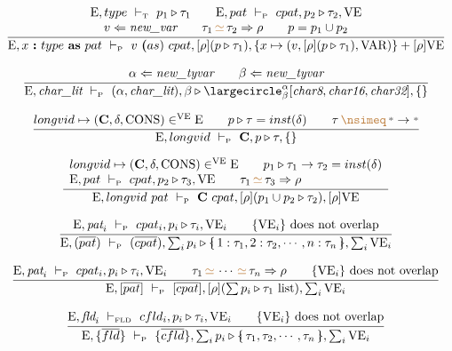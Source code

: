 \documentclass[11pt,a4paper]{article}
\newcommand{\key}[1]{\textrm{\textbf{#1}}}
\newcommand{\prodlhs}[1]{\textit{#1}}
\newcommand{\record}[1]{\{\!\!\shortmid #1 \shortmid\!\!\}}
\newcommand{\overld}[3]{\largecircle^{#1}_{#2}{#3}}
\newcommand{\qualtype}[2]{#1 \triangleright #2}
\newcommand{\unify}[3]{#1\,{\color{brown}{\simeq}}\,#2 \Rightarrow #3}
\newcommand{\unifylist}[3]{#1\,{\color{brown}{\simeq}}\,\cdots\,{\color{brown}{\simeq}}\,#2 \Rightarrow #3}
\newcommand{\notunifiable}[2]{#1\,{\color{brown}{\nsimeq}}\,#2}
\newcommand{\braced}[1]{\{#1\}}
\newcommand{\wildcard}{{\color{gray}\scriptstyle\textbf{*}}}
\newcommand{\litchar}{\textit{char\_lit}}
\newcommand{\Char}[1]{\textit{char#1}}
\newcommand{\Env}  {\textrm{E}}
\newcommand{\VE}   {\textrm{VE}}
\newcommand{\VKC}  {\textrm{CONS}}
\newcommand{\VKV}  {\textrm{VAR}}
\newcommand{\vcon} {\mathbf{C}}
\newcommand{\Empty}{\braced{}}
\newcommand{\vdashP}  {\ \vdash_{\textrm{\tiny P}}\  }
\newcommand{\vdashT}  {\ \vdash_{\textrm{\tiny T}}\  }
\newcommand{\vdashFLD}{\ \vdash_\textrm{\tiny FLD}\  }
\newcommand{\corenew}[1]{\textit{new\_#1}}
\begin{document}
\[
\cfrac
 {\begin{array}{c}
  \Env,type \vdashT \qualtype{p_1}{\tau_1}              \qquad
  \Env,pat \vdashP cpat,\qualtype{p_2}{\tau_2}, \VE     \\
  v   \Leftarrow \corenew{var}                          \qquad  
  \unify{\tau_1}{\tau_2}{\rho}                          \qquad
  p = p_1 \cup p_2
  \end{array}}
 {\Env, x\ \key{:}\ type\ \key{as}\ pat \vdashP 
    v\ \key(as)\ cpat, [\rho](\qualtype{p}{\tau_1}), \braced{x \mapsto (v, [\rho](\qualtype{p}{\tau_1}), \VKV)} + [\rho]\VE}
\]

\[
\cfrac
 {\alpha \Leftarrow \corenew{tyvar} \qquad
  \beta  \Leftarrow \corenew{tyvar}}
 {\Env, \litchar \vdashP (\alpha,\litchar), \qualtype{\beta}{\overld{\alpha}{\beta}{[\Char{8},\Char{16},\Char{32}]}}, \Empty}
\]

\[
\cfrac
 {longvid \mapsto (\vcon, \delta, \VKC) \in^\VE \Env \qquad
  \qualtype{p}{\tau} = inst(\delta)    \qquad
  \notunifiable{\tau}{\wildcard \to \wildcard} }
 {\Env, longvid \vdashP \vcon, \qualtype{p}{\tau}, \Empty}
\]

\[
\cfrac
 {\begin{array}{l}
  longvid \mapsto (\vcon, \delta, \VKC) \in^\VE \Env     \qquad
  \qualtype{p_1}{\tau_1\to\tau_2} = inst(\delta)         \\
  \Env,pat \vdashP cpat, \qualtype{p_2}{\tau_3},\VE      \qquad
  \unify{\tau_1}{\tau_3}{\rho}                           \\
  \end{array}}
 {\Env, longvid\ pat \vdashP \vcon\ cpat, [\rho](\qualtype{p_1 \cup p_2}{\tau_2}), [\rho]\VE}
\]

\[
\cfrac
 {\Env,\prodlhs{pat}_i \vdashP cpat_i,\qualtype{p_i}{\tau_i},\VE_i \qquad
  \braced{\VE_i}\ \textrm{does not overlap}}
 {\Env, (\overline{pat}) \vdashP
  (\overline{cpat}), \qualtype{\sum_i p_i}{\record{1:\tau_1,2:\tau_2,\cdots,n:\tau_n}}, \sum_i\VE_i}
\]

\[
\cfrac
 {\Env,\prodlhs{pat}_i \vdashP cpat_i,\qualtype{p_i}{\tau_i},\VE_i  \qquad
  \unifylist{\tau_1}{\tau_n}{\rho}                                  \qquad
  \braced{\VE_i}\ \textrm{does not overlap}}
 {\Env, [\overline{pat}] \vdashP
    [\overline{cpat}], [\rho](\qualtype{\sum p_i}{\tau_1\ \textrm{list}}), \sum_i\VE_i}
\]

\[
\cfrac
 {\Env,\prodlhs{fld}_i \vdashFLD cfld_i,\qualtype{p_i}{\tau_i},\VE_i \qquad
  \braced{\VE_i}\ \textrm{does not overlap}}
 {\Env, \braced{\overline{fld}} \vdashP
    \braced{\overline{cfld}}, \qualtype{\sum_i p_i}{\record{\tau_1,\tau_2,\cdots,\tau_n}}, \sum_i\VE_i}
\]
\end{document}
